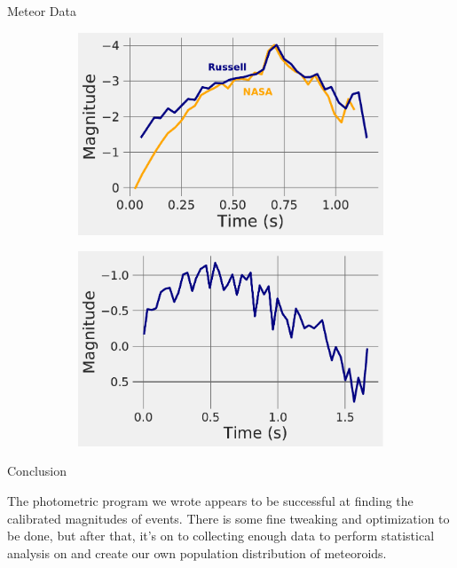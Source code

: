 \documentclass[final]{beamer}
\newlength{\twocolwid}
\begin{document}
\begin{frame}[t]
\begin{columns}[t]
\begin{column}{\twocolwid}
\begin{alertblock}{Meteor Data}
\begin{figure}
\centering
\begin{subfigure}{.5\textwidth}
  \centering
  \includegraphics[width=\linewidth]{LightComparison0.pdf}
  \label{fig:sub1}
\end{subfigure}%
\begin{subfigure}{.5\textwidth}
  \centering
  \includegraphics[width=\linewidth]{D6Curve.pdf}
  \label{fig:sub2}
\end{subfigure}
\label{fig:test}
\end{figure}

\end{alertblock}

\vspace{-1.5cm}


\begin{block}{Conclusion}

The photometric program we wrote appears to be successful at finding the calibrated magnitudes of events. There is some fine tweaking and optimization to be done, but after that, it's on to collecting enough data to perform statistical analysis on and create our own population distribution of meteoroids. 


\end{block}
\end{column}
\end{columns}
\end{frame}
\end{document}
